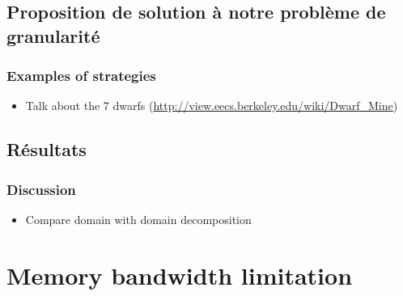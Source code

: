 \documentclass[oneside,12t]{classes/Thesis}
\begin{document}
\section{Proposition de solution à notre problème de granularité}






\subsection{Examples of strategies}
  \begin{itemize}
    \item Talk about the 7 dwarfs (\url{http://view.eecs.berkeley.edu/wiki/Dwarf_Mine})
  \end{itemize}




\section{Résultats}



\subsection{Discussion}
  \begin{itemize}
    \item Compare domain with domain decomposition
  \end{itemize}





\chapter{Memory bandwidth limitation}
\minitoc
\vspace{1cm}



\end{document}
